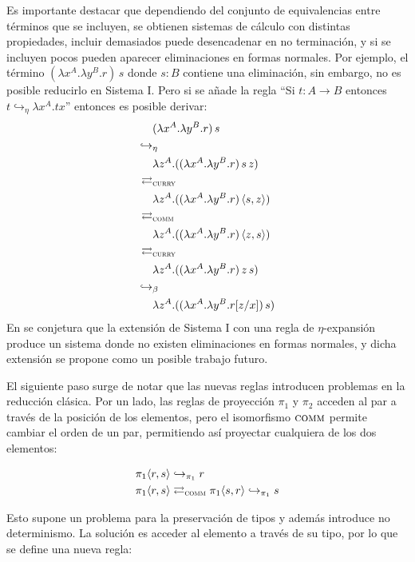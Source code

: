 Es importante destacar que dependiendo del conjunto de equivalencias entre términos que se incluyen, se obtienen sistemas de cálculo con distintas propiedades, incluir demasiados puede desencadenar en no terminación, y si se incluyen pocos pueden aparecer eliminaciones en formas normales.
Por ejemplo, el término $(\lambda x^A.\lambda y^B.r)\, s$ donde $s : B$ contiene una eliminación, sin embargo, no es posible reducirlo en Sistema I.
Pero si se añade la regla ``Si $t : A \rightarrow B$ entonces $t \hookrightarrow_\eta \lambda x^A.t x$'' entonces es posible derivar:
\begin{align*}
	&(\lambda x^A.\lambda y^B.r)\,s \\
	\hookrightarrow&_\eta \\
	&\lambda z^A.((\lambda x^A.\lambda y^B.r)\,s\,z) \\
	\rightleftarrows&_{\textsc{curry}} \\
	&\lambda z^A.((\lambda x^A.\lambda y^B.r)\,\langle s,z \rangle) \\
	\rightleftarrows&_{\textsc{comm}} \\
	&\lambda z^A.((\lambda x^A.\lambda y^B.r)\,\langle z,s \rangle) \\
	\rightleftarrows&_{\textsc{curry}} \\
	&\lambda z^A.((\lambda x^A.\lambda y^B.r)\,z\,s) \\
	\hookrightarrow&_\beta \\
	&\lambda z^A.((\lambda x^A.\lambda y^B.r[z/x])\,s)
\end{align*}
En \cite{system-i} se conjetura que la extensión de Sistema I con una regla de $\eta$-expansión produce un sistema donde no existen eliminaciones en formas normales, y dicha extensión se propone como un posible trabajo futuro.

El siguiente paso surge de notar que las nuevas reglas introducen problemas en la reducción clásica.
Por un lado, las reglas de proyección $\pi_1$ y $\pi_2$ acceden al par a través de la posición de los elementos, pero el isomorfismo $\textsc{comm}$ permite cambiar el orden de un par, permitiendo así proyectar cualquiera de los dos elementos:

\begin{align*}
	\pi_1 \langle r, s \rangle& \hookrightarrow_{\pi_1} r \\
	\pi_1 \langle r, s \rangle& \rightleftarrows_{\textsc{comm}} \pi_1 \langle s, r \rangle \hookrightarrow_{\pi_1} s
\end{align*}

Esto supone un problema para la preservación de tipos y además introduce no determinismo.
La solución es acceder al elemento a través de su tipo, por lo que se define una nueva regla:

